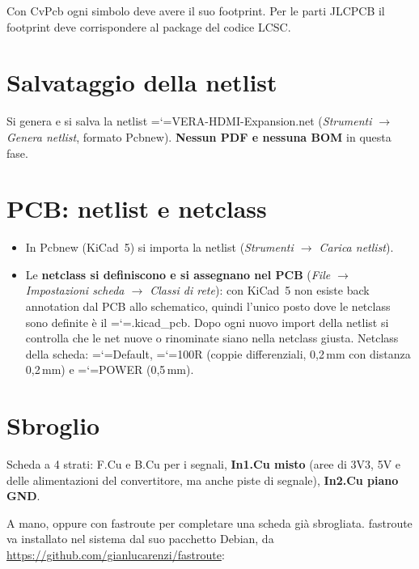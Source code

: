 \documentclass[11pt,a4paper]{article}
\makeatletter
\newcommand{\file}[1]{{\ttfamily\hyphenchar\font=`\-\relax\language=\l@nohyphenation #1}}
\makeatother
\begin{document}
Con CvPcb ogni simbolo deve avere il suo footprint. Per le parti JLCPCB il
footprint deve corrispondere al package del codice LCSC.

\section{Salvataggio della netlist}

Si genera e si salva la netlist \file{VERA-HDMI-Expansion.net} (\emph{Strumenti
$\rightarrow$ Genera netlist}, formato Pcbnew). \textbf{Nessun PDF e nessuna
BOM} in questa fase.

\section{PCB: netlist e netclass}

\begin{itemize}[leftmargin=*]
  \item In Pcbnew (KiCad~5) si importa la netlist (\emph{Strumenti
        $\rightarrow$ Carica netlist}).
  \item Le \textbf{netclass si definiscono e si assegnano nel PCB}
        (\emph{File $\rightarrow$ Impostazioni scheda $\rightarrow$ Classi di
        rete}): con KiCad~5 non esiste back annotation dal PCB allo
        schematico, quindi l'unico posto dove le netclass sono definite è il
        \file{.kicad\_pcb}. Dopo ogni nuovo import della netlist si controlla
        che le net nuove o rinominate siano nella netclass giusta. Netclass
        della scheda: \file{Default}, \file{100R} (coppie differenziali,
        0,2\,mm con distanza 0,2\,mm) e \file{POWER} (0,5\,mm).
\end{itemize}

\section{Sbroglio}

Scheda a 4 strati: F.Cu e B.Cu per i segnali, \textbf{In1.Cu misto} (aree di
3V3, 5V e delle alimentazioni del convertitore, ma anche piste di segnale),
\textbf{In2.Cu piano GND}.

A mano, oppure con fastroute per completare una scheda già sbrogliata.
fastroute va installato nel sistema dal suo pacchetto Debian, da
\url{https://github.com/gianlucarenzi/fastroute}:
\end{document}

